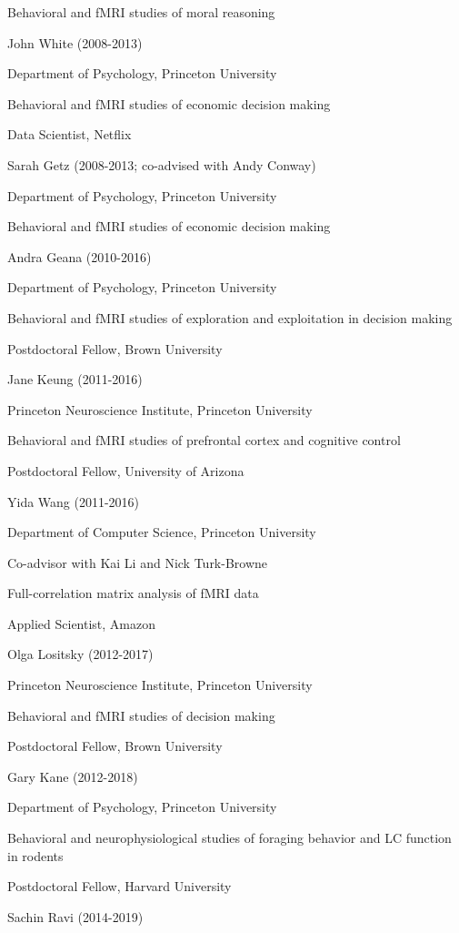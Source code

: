 \documentclass[10 pt]{article}
\begin{document}
Behavioral and fMRI studies of moral reasoning
    \medskip

John White (2008-2013)

Department of Psychology, Princeton University

Behavioral and fMRI studies of economic decision making

Data Scientist, Netflix
    \medskip

Sarah Getz (2008-2013; co-advised with Andy Conway)

Department of Psychology, Princeton University

Behavioral and fMRI studies of economic decision making
    \medskip

Andra Geana (2010-2016)

Department of Psychology, Princeton University

Behavioral and fMRI studies of exploration and exploitation in decision making

Postdoctoral Fellow, Brown University
    \medskip

Jane Keung (2011-2016)

Princeton Neuroscience Institute, Princeton University

Behavioral and fMRI studies of prefrontal cortex and cognitive control

Postdoctoral Fellow, University of Arizona
    \medskip

Yida Wang (2011-2016)

Department of Computer Science, Princeton University

Co-advisor with Kai Li and Nick Turk-Browne

Full-correlation matrix analysis of fMRI data

Applied Scientist, Amazon
    \medskip

Olga Lositsky (2012-2017)

Princeton Neuroscience Institute, Princeton University

Behavioral and fMRI studies of decision making

Postdoctoral Fellow, Brown University
    \medskip

Gary Kane (2012-2018)

Department of Psychology, Princeton University

Behavioral and neurophysiological studies of foraging behavior and LC function in rodents

Postdoctoral Fellow, Harvard University
    \medskip

Sachin Ravi (2014-2019)
\end{document}
